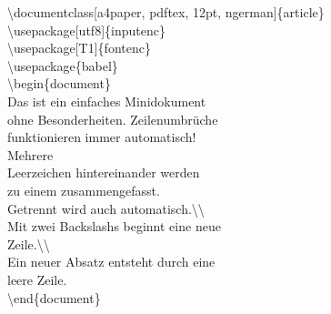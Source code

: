 \color{nounibaredI}\color{nounibaredI}\textbackslash documentclass\color{black}\color{nounibagreenI}[a4paper, pdftex, 12pt, ngerman]\color{black}\{article\} \\
\color{nounibaredI}\color{nounibaredI}\textbackslash usepackage\color{black}\color{nounibagreenI}[utf8]\color{black}\{inputenc\} \\
\color{nounibaredI}\color{nounibaredI}\textbackslash usepackage\color{black}\color{nounibagreenI}[T1]\color{black}\{fontenc\} \\
\color{nounibaredI}\color{nounibaredI}\textbackslash usepackage\color{black}\{babel\} \\
\color{nounibaredI}\color{unibablueI}\textbackslash\color{unibablueI}begin\color{black}\color{black}\{document\} \\
Das ist ein einfaches Minidokument \\
ohne Besonderheiten. Zeilenumbrüche \\
funktionieren immer automatisch! \\
Mehrere \\
Leerzeichen hintereinander werden  \\
zu      einem zusammengefasst. \\
Getrennt wird auch automatisch.\color{nounibaredI}\color{nounibaredI}\textbackslash \color{nounibaredI}\textbackslash \color{black} \\
Mit zwei Backslashs beginnt eine neue \\
Zeile.\color{nounibaredI}\color{nounibaredI}\textbackslash \color{nounibaredI}\textbackslash \color{black} \\
Ein neuer Absatz entsteht durch eine \\
leere Zeile. \\
\color{nounibaredI}\color{unibablueI}\textbackslash\color{unibablueI}end\color{black}\color{black}\{document\} \\
